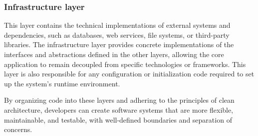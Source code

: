 \subsubsection*{Infrastructure layer}
This layer contains the technical implementations of external systems and dependencies,
such as databases, web services, file systems, or third-party libraries. The
infrastructure layer provides concrete implementations of the interfaces and abstractions
defined in the other layers, allowing the core application to remain decoupled from
specific technologies or frameworks. This layer is also responsible for any configuration
or initialization code required to set up the system's runtime environment.

By organizing code into these layers and adhering to the principles of clean architecture,
developers can create software systems that are more flexible, maintainable, and testable,
with well-defined boundaries and separation of concerns.